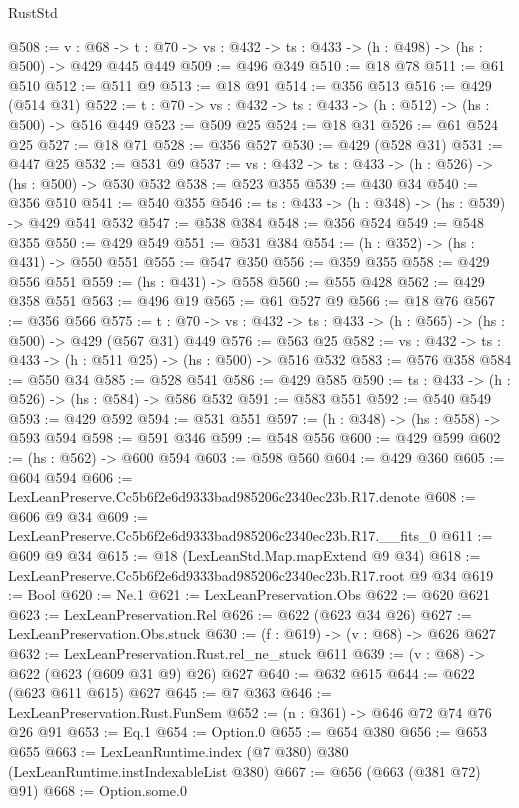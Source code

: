 \begin{lexlean}{RustStd}
\begin{coremodule}
@508 := {v : @68} ->
  {t : @70} -> {vs : @432} -> {ts : @433} -> (h : @498) -> (hs : @500) -> @429 @445 @449
@509 := @496 @349
@510 := @18 @78
@511 := @61 @510
@512 := @511 @9
@513 := @18 @91
@514 := @356 @513
@516 := @429 (@514 @31)
@522 := {t : @70} -> {vs : @432} -> {ts : @433} -> (h : @512) -> (hs : @500) -> @516 @449
@523 := @509 @25
@524 := @18 @31
@526 := @61 @524 @25
@527 := @18 @71
@528 := @356 @527
@530 := @429 (@528 @31)
@531 := @447 @25
@532 := @531 @9
@537 := {vs : @432} -> {ts : @433} -> (h : @526) -> (hs : @500) -> @530 @532
@538 := @523 @355
@539 := @430 @34
@540 := @356 @510
@541 := @540 @355
@546 := {ts : @433} -> (h : @348) -> (hs : @539) -> @429 @541 @532
@547 := @538 @384
@548 := @356 @524
@549 := @548 @355
@550 := @429 @549
@551 := @531 @384
@554 := (h : @352) -> (hs : @431) -> @550 @551
@555 := @547 @350
@556 := @359 @355
@558 := @429 @556 @551
@559 := (hs : @431) -> @558
@560 := @555 @428
@562 := @429 @358 @551
@563 := @496 @19
@565 := @61 @527 @9
@566 := @18 @76
@567 := @356 @566
@575 := {t : @70} -> {vs : @432} -> {ts : @433} -> (h : @565) -> (hs : @500) -> @429 (@567 @31) @449
@576 := @563 @25
@582 := {vs : @432} -> {ts : @433} -> (h : @511 @25) -> (hs : @500) -> @516 @532
@583 := @576 @358
@584 := @550 @34
@585 := @528 @541
@586 := @429 @585
@590 := {ts : @433} -> (h : @526) -> (hs : @584) -> @586 @532
@591 := @583 @551
@592 := @540 @549
@593 := @429 @592
@594 := @531 @551
@597 := (h : @348) -> (hs : @558) -> @593 @594
@598 := @591 @346
@599 := @548 @556
@600 := @429 @599
@602 := (hs : @562) -> @600 @594
@603 := @598 @560
@604 := @429 @360
@605 := @604 @594
@606 := LexLeanPreserve.Cc5b6f2e6d9333bad985206c2340ec23b.R17.denote
@608 := @606 @9 @34
@609 := LexLeanPreserve.Cc5b6f2e6d9333bad985206c2340ec23b.R17.__fits_0
@611 := @609 @9 @34
@615 := @18 (LexLeanStd.Map.mapExtend @9 @34)
@618 := LexLeanPreserve.Cc5b6f2e6d9333bad985206c2340ec23b.R17.root @9 @34
@619 := Bool
@620 := Ne.{1}
@621 := LexLeanPreservation.Obs
@622 := @620 @621
@623 := LexLeanPreservation.Rel
@626 := @622 (@623 @34 @26)
@627 := LexLeanPreservation.Obs.stuck
@630 := (f : @619) -> (v : @68) -> @626 @627
@632 := LexLeanPreservation.Rust.rel_ne_stuck @611
@639 := (v : @68) -> @622 (@623 (@609 @31 @9) @26) @627
@640 := @632 @615
@644 := @622 (@623 @611 @615) @627
@645 := @7 @363
@646 := LexLeanPreservation.Rust.FunSem
@652 := (n : @361) -> @646 @72 @74 @76 @26 @91
@653 := Eq.{1}
@654 := Option.{0}
@655 := @654 @380
@656 := @653 @655
@663 := LexLeanRuntime.index (@7 @380) @380 (LexLeanRuntime.instIndexableList @380)
@667 := @656 (@663 (@381 @72) @91)
@668 := Option.some.{0}

\end{coremodule}
\end{lexlean}
